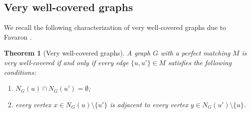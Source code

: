 \documentclass[10pt,a4paper]{amsart}
\numberwithin{equation}{section}
\newtheorem{thm}{\bf Theorem}[section]
\theoremstyle{definition}
\begin{document}
\subsection{Very well-covered graphs} We recall the following characterization of very well-covered graphs due to Favaron \cite[Theorem 1.2]{F}.

\begin{thm}[Very well-covered graphs]\label{thm_very_well_char} 
A graph $G$ with a perfect matching $M$ is very well-covered if and only if every edge $\{u, u'\} \in M$ satisfies the following conditions:
\begin{enumerate}
    \item $N_G(u) \cap N_G(u') = \emptyset$;
    \item every vertex $x \in N_G(u) \setminus \{u'\}$ is adjacent to every vertex $y \in N_G(u') \setminus \{u\}$.
\end{enumerate}
\end{thm}
\end{document}
